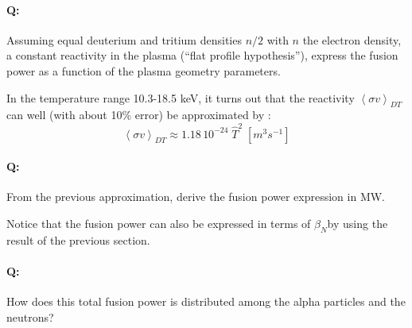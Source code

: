 \paragraph{Q:} Assuming equal deuterium and tritium densities $n/2$ with $n$ the electron density,  a constant reactivity in the plasma (``flat profile hypothesis''), express the  fusion power as a function of the plasma geometry parameters.

In the temperature range 10.3-18.5 keV, it turns out that the reactivity $\left< \sigma v \right>_{DT}$ can well (with about 10$\%$ error) be approximated by \cite[(1.5.4)]{Wesson2004}: 
\begin{equation*}
  \left< \sigma v \right>_{DT} \approx 1.18\, 10^{-24}\; \hat T^2 \;\si{\left[m^3 s^{-1}\right]}
\end{equation*}

\paragraph{Q:}  From the previous approximation, derive the fusion power expression in MW.

Notice that the fusion power can also be expressed in terms of $\beta_N$by using the result of the previous section.

\paragraph{Q:}  How does this total fusion power is distributed among the alpha particles and the neutrons?

